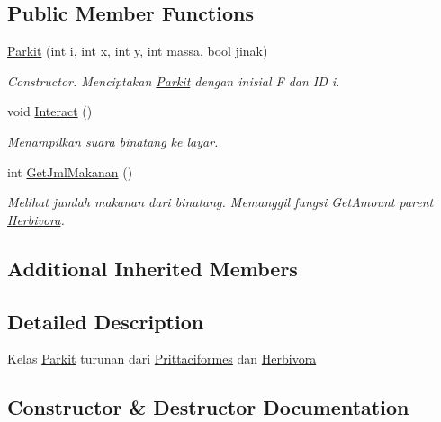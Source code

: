 \subsection*{Public Member Functions}
\begin{DoxyCompactItemize}
\item 
\hyperlink{classParkit_a038d7efe3fad9f0ec83e2d51397cab3f}{Parkit} (int i, int x, int y, int massa, bool jinak)
\begin{DoxyCompactList}\small\item\em Constructor. Menciptakan \hyperlink{classParkit}{Parkit} dengan inisial \textquotesingle{}F\textquotesingle{} dan ID i. \end{DoxyCompactList}\item 
void \hyperlink{classParkit_ab468ef7fea02e646466be1669f9aabb9}{Interact} ()\hypertarget{classParkit_ab468ef7fea02e646466be1669f9aabb9}{}\label{classParkit_ab468ef7fea02e646466be1669f9aabb9}

\begin{DoxyCompactList}\small\item\em Menampilkan suara binatang ke layar. \end{DoxyCompactList}\item 
int \hyperlink{classParkit_a2c4755adea1478b458052fe975e212dc}{Get\+Jml\+Makanan} ()
\begin{DoxyCompactList}\small\item\em Melihat jumlah makanan dari binatang. Memanggil fungsi Get\+Amount parent \hyperlink{classHerbivora}{Herbivora}. \end{DoxyCompactList}\end{DoxyCompactItemize}
\subsection*{Additional Inherited Members}


\subsection{Detailed Description}
Kelas \hyperlink{classParkit}{Parkit} turunan dari \hyperlink{classPrittaciformes}{Prittaciformes} dan \hyperlink{classHerbivora}{Herbivora} 

\subsection{Constructor \& Destructor Documentation}
